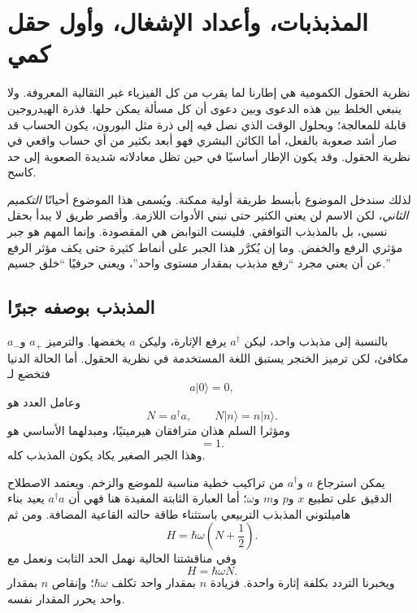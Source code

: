 \chapter{المذبذبات، وأعداد الإشغال، وأول حقل كمي}

نظرية الحقول الكمومية هي إطارنا لما يقرب من كل الفيزياء غير الثقالية المعروفة. ولا ينبغي الخلط بين هذه الدعوى وبين دعوى أن كل مسألة يمكن حلها. فذرة الهيدروجين قابلة للمعالجة؛ وبحلول الوقت الذي نصل فيه إلى ذرة مثل البورون، يكون الحساب قد صار أشد صعوبة بالفعل، أما الكائن البشري فهو أبعد بكثير من أي حساب واقعي في نظرية الحقول. وقد يكون الإطار أساسيًا في حين تظل معادلاته شديدة الصعوبة إلى حد كاسح.

لذلك سندخل الموضوع بأبسط طريقة أولية ممكنة. ويُسمى هذا الموضوع أحيانًا \emph{التكميم الثاني}، لكن الاسم لن يعني الكثير حتى نبني الأدوات اللازمة. وأقصر طريق لا يبدأ بحقل نسبي، بل بالمذبذب التوافقي. فليست النوابض هي المقصودة. وإنما المهم هو جبر مؤثري الرفع والخفض. وما إن يُكرَّر هذا الجبر على أنماط كثيرة حتى يكف مؤثر الرفع عن أن يعني مجرد ``رفع مذبذب بمقدار مستوى واحد''، ويعني حرفيًا ``خلق جسيم.''

\section{المذبذب بوصفه جبرًا}

بالنسبة إلى مذبذب واحد، ليكن \(a^\dagger\) يرفع الإثارة، وليكن \(a\) يخفضها. والترميز \(a_+\) و\(a_-\) مكافئ، لكن ترميز الخنجر يستبق اللغة المستخدمة في نظرية الحقول. أما الحالة الدنيا فتخضع لـ
\begin{equation}
a|0\rangle=0,
\end{equation}
وعامل العدد هو
\begin{equation}
N=a^\dagger a,
\qquad
N|n\rangle=n|n\rangle.
\end{equation}
ومؤثرا السلم هذان مترافقان هيرميتيًا، ومبدلهما الأساسي هو
\begin{equation}
[a,a^\dagger]=1.
\label{eq:l06-single-commutator}
\end{equation}
وهذا الجبر الصغير يكاد يكون المذبذب كله.

يمكن استرجاع \(a\) و\(a^\dagger\) من تراكيب خطية مناسبة للموضع والزخم. ويعتمد الاصطلاح الدقيق على تطبيع \(x\) و\(p\) و\(m\) و\(\omega\)؛ أما العبارة الثابتة المفيدة هنا فهي أن \(a^\dagger a\) يعيد بناء هاميلتوني المذبذب التربيعي باستثناء طاقة حالته القاعية المضافة. ومن ثم
\begin{equation}
H=\hbar\omega\left(N+\frac12\right).
\end{equation}
وفي مناقشتنا الحالية نهمل الحد الثابت ونعمل مع
\begin{equation}
H=\hbar\omega N.
\label{eq:l06-one-oscillator-hamiltonian}
\end{equation}
ويخبرنا التردد بكلفة إثارة واحدة. فزيادة \(n\) بمقدار واحد تكلف \(\hbar\omega\)؛ وإنقاص \(n\) بمقدار واحد يحرر المقدار نفسه.

